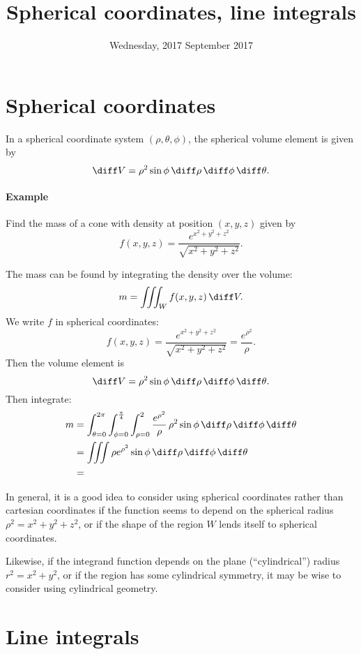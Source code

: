 \documentclass{multi}
\title{Spherical coordinates, line integrals}
\date{Wednesday, 2017 September 2017}
\begin{document}
\section*{Spherical coordinates}

In a spherical coordinate system \((\rho, \theta, \phi)\), the spherical volume element is given by
\[
    \diff V = \rho^2 \sin \phi \, \diff \rho \, \diff \phi \, \diff \theta.
\]



\paragraph{Example}

\begin{mdframed}
    Find the mass of a cone with density at position \((x, y, z)\) given by
    \[
        f(x, y, z) = \frac{e^{x^2 +y^2+z^2}}{\sqrt{x^2 + y^2 + z^2}}.
    \]
\end{mdframed}

The mass can be found by integrating the density over the volume:
\[
    m = \iiint_W f(x, y, z) \, \diff V.
\]
We write \(f\) in spherical coordinates:
\[
    f(x, y, z) = \frac{e^{x^2 + y^2 + z^2}}{\sqrt{x^2 + y^2 + z^2}} = \frac{e^{\rho^2}}{\rho}.
\]
Then the volume element is
\[
    \diff V = \rho^2 \sin \phi \, \diff \rho \, \diff \phi \, \diff \theta.
\]
Then integrate:
\begin{align*}
    m &= \int_{\theta=0}^{2\pi} \int_{\phi=0}^{\frac \pi 4} \int_{\rho=0}^{2} 
    \frac{e^{\rho^2}}{\rho} \, \rho^2 \sin \phi \, \diff \rho \, \diff \phi \, \diff \theta \\
    &= \iiint \rho e^{\rho^2} \sin \phi \, \diff \rho \, \diff \phi \, \diff \theta \\
    &= 
\end{align*}


In general, it is a good idea to consider using spherical coordinates rather than cartesian coordinates if the function seems to depend on the spherical radius \(\rho^2 = x^2+y^2+z^2\), or if the shape of the region \(W\) lends itself to spherical coordinates.

Likewise, if the integrand function depends on the plane (``cylindrical'') radius \(r^2 = x^2+y^2\), or if the region has some cylindrical symmetry, it may be wise to consider using cylindrical geometry.

\section*{Line integrals}
\end{document}
